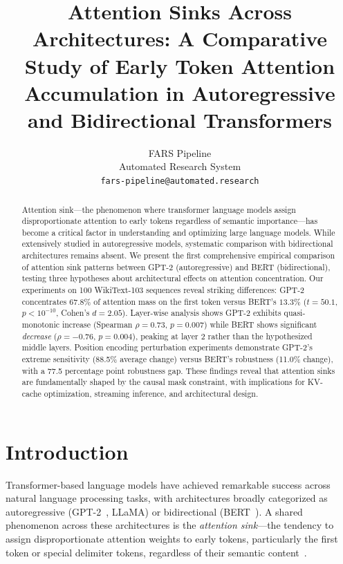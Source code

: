 \documentclass{article}
\title{Attention Sinks Across Architectures: A Comparative Study of Early Token Attention Accumulation in Autoregressive and Bidirectional Transformers}
\author{
  FARS Pipeline \\
  Automated Research System \\
  \texttt{fars-pipeline@automated.research}
}
\begin{document}
\maketitle

\begin{abstract}
Attention sink---the phenomenon where transformer language models assign disproportionate attention to early tokens regardless of semantic importance---has become a critical factor in understanding and optimizing large language models. While extensively studied in autoregressive models, systematic comparison with bidirectional architectures remains absent. We present the first comprehensive empirical comparison of attention sink patterns between GPT-2 (autoregressive) and BERT (bidirectional), testing three hypotheses about architectural effects on attention concentration. Our experiments on 100 WikiText-103 sequences reveal striking differences: GPT-2 concentrates $67.8\%$ of attention mass on the first token versus BERT's $13.3\%$ ($t=50.1$, $p<10^{-10}$, Cohen's $d=2.05$). Layer-wise analysis shows GPT-2 exhibits quasi-monotonic increase (Spearman $\rho=0.73$, $p=0.007$) while BERT shows significant \emph{decrease} ($\rho=-0.76$, $p=0.004$), peaking at layer 2 rather than the hypothesized middle layers. Position encoding perturbation experiments demonstrate GPT-2's extreme sensitivity (88.5\% average change) versus BERT's robustness (11.0\% change), with a 77.5 percentage point robustness gap. These findings reveal that attention sinks are fundamentally shaped by the causal mask constraint, with implications for KV-cache optimization, streaming inference, and architectural design.
\end{abstract}

\section{Introduction}

Transformer-based language models have achieved remarkable success across natural language processing tasks, with architectures broadly categorized as autoregressive (GPT-2~\citep{radford2019language}, LLaMA) or bidirectional (BERT~\citep{devlin2019bert}). A shared phenomenon across these architectures is the \emph{attention sink}---the tendency to assign disproportionate attention weights to early tokens, particularly the first token or special delimiter tokens, regardless of their semantic content~\citep{xiao2023efficient}.
\end{document}
